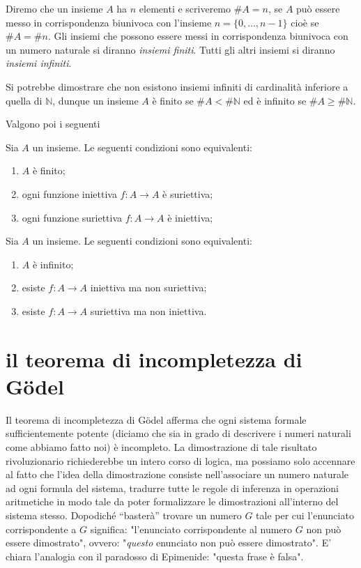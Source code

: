 \documentclass[italian,a4paper,hidelinks]{scrartcl}
\newcommand{\NN}{{\mathbb N}}
\newcommand{\myemph}[1]{\emph{#1}\marginpar{#1}}
\begin{document}
Diremo che un insieme $A$ ha $n$ elementi e scriveremo $\# A = n$,
se $A$ può essere messo in corrispondenza
biunivoca con l'insieme $n= \{0, \dots, n-1\}$ cioè se $\# A = \# n$.
Gli insiemi che possono essere messi in corrispondenza biunivoca con
un numero naturale si diranno \myemph{insiemi finiti}.
Tutti gli altri insiemi si diranno \myemph{insiemi infiniti}.

Si potrebbe dimostrare che non esistono insiemi infiniti di cardinalità
inferiore a quella di $\NN$, dunque un insieme $A$ è finito se $\# A < \#\NN$
ed è infinito se $\# A \ge \# \NN$.

Valgono poi i seguenti
\begin{theorem}
Sia $A$ un insieme. Le seguenti condizioni sono equivalenti:
\begin{enumerate}
\item $A$ è finito;
\item ogni funzione iniettiva $f\colon A \to A$ è suriettiva;
\item ogni funzione suriettiva $f\colon A \to A$ è iniettiva;
\end{enumerate}
\end{theorem}

\begin{theorem}
Sia $A$ un insieme. Le seguenti condizioni sono equivalenti:
\begin{enumerate}
\item $A$ è infinito;
\item esiste $f\colon A\to A$ iniettiva ma non suriettiva;
\item esiste $f\colon A\to A$ suriettiva ma non iniettiva.
\end{enumerate}
\end{theorem}

\section{il teorema di incompletezza di G\"odel}

Il teorema di incompletezza di G\"odel afferma che ogni
sistema formale sufficientemente potente (diciamo che sia in grado di
descrivere i numeri naturali come abbiamo fatto noi) è incompleto.
La dimostrazione di tale risultato rivoluzionario richiederebbe un intero
corso di logica, ma possiamo solo accennare al fatto che l'idea della
dimostrazione consiste nell'associare un numero naturale ad ogni formula
del sistema, tradurre tutte le regole di inferenza in operazioni aritmetiche
in modo tale da poter formalizzare le dimostrazioni all'interno del sistema
stesso. Dopodiché ``basterà'' trovare un numero $G$ tale per cui
l'enunciato corrispondente a $G$ significa:
"l'enunciato corrispondente al numero $G$ non può essere dimostrato",
ovvero: "\emph{questo} enunciato non può essere dimostrato".
E' chiara l'analogia con il paradosso di Epimenide: "questa frase è falsa".
\end{document}
